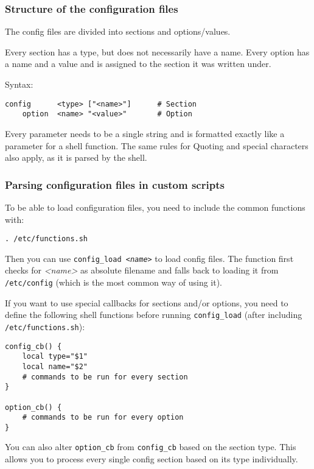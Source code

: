 \subsubsection{Structure of the configuration files}

The config files are divided into sections and options/values.

Every section has a type, but does not necessarily have a name.
Every option has a name and a value and is assigned to the section
it was written under.

Syntax:

\begin{Verbatim}
config      <type> ["<name>"]      # Section
    option  <name> "<value>"       # Option
\end{Verbatim}

Every parameter needs to be a single string and is formatted exactly
like a parameter for a shell function. The same rules for Quoting and
special characters also apply, as it is parsed by the shell.

\subsubsection{Parsing configuration files in custom scripts}

To be able to load configuration files, you need to include the common
functions with:

\begin{Verbatim}
. /etc/functions.sh
\end{Verbatim}

Then you can use \texttt{config\_load \textit{<name>}} to load config files. The function
first checks for \textit{<name>} as absolute filename and falls back to loading
it from \texttt{/etc/config} (which is the most common way of using it).

If you want to use special callbacks for sections and/or options, you
need to define the following shell functions before running \texttt{config\_load}
(after including \texttt{/etc/functions.sh}):

\begin{Verbatim}
config_cb() {
    local type="$1"
    local name="$2"
    # commands to be run for every section
}

option_cb() {
    # commands to be run for every option
}
\end{Verbatim}

You can also alter \texttt{option\_cb} from \texttt{config\_cb} based on the section type.
This allows you to process every single config section based on its type
individually.

